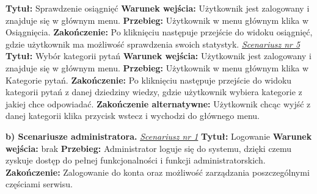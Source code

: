 \newline \textbf{Tytuł:} Sprawdzenie osiągnięć
\newline \textbf{Warunek wejścia:} Użytkownik jest zalogowany i znajduje się w głównym menu.
\newline \textbf{Przebieg:} Użytkownik w menu głównym klika w Osiągnięcia.
\newline \textbf{Zakończenie:} Po kliknięciu następuje przejście do widoku osiągnięć, gdzie użytkownik ma możliwość sprawdzenia swoich statystyk.
\newline\newline \textit{\underline{Scenariusz nr 5}}
\newline \textbf{Tytuł:} Wybór kategorii pytań
\newline \textbf{Warunek wejścia:} Użytkownik jest zalogowany i znajduje się w głównym menu.
\newline \textbf{Przebieg:} Użytkownik w menu głównym klika w Kategorie pytań.
\newline \textbf{Zakończenie:} Po kliknięciu następuje przejście do widoku kategorii pytań z danej dziedziny wiedzy, gdzie użytkownik wybiera kategorie z jakiej chce odpowiadać.
\newline \textbf{Zakończenie alternatywne:} Użytkownik chcąc wyjść z danej kategorii klika przycisk wstecz i wychodzi do głównego menu. 


\textbf{b) Scenariusze administratora.}
\newline \textit{\underline{Scenariusz nr 1}}
\newline \textbf{Tytuł:} Logowanie
\newline \textbf{Warunek wejścia:} brak
\newline \textbf{Przebieg:} Administrator loguje się do systemu, dzięki czemu zyskuje dostęp do pełnej funkcjonalności i funkcji administratorskich.
\newline \textbf{Zakończenie:} Zalogowanie do konta oraz możliwość zarządzania poszczególnymi częściami serwisu.
